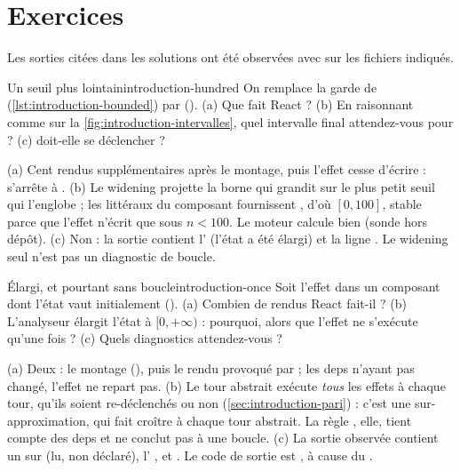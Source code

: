 \section{Exercices}
\label{sec:introduction-exercices}

Les sorties citées dans les solutions ont été observées avec
 sur les fichiers indiqués.

\begin{exercice}{Un seuil plus lointain}{introduction-hundred}
  On remplace la garde de  (\cref{lst:introduction-bounded})
  par  ().
  (a) Que fait React ? (b) En raisonnant comme sur la
  \cref{fig:introduction-intervalles}, quel intervalle final attendez-vous
  pour  ? (c)  doit-elle se déclencher ?
\end{exercice}
\begin{solution}
  (a) Cent rendus supplémentaires après le montage, puis l'effet cesse
  d'écrire :  s'arrête à . (b) Le widening projette la
  borne qui grandit sur le plus petit seuil qui l'englobe ; les littéraux du
  composant fournissent , d'où $[0,100]$, stable parce que l'effet
  n'écrit que sous $n<100$. Le moteur calcule bien 
  (sonde hors dépôt). (c) Non : la sortie contient l'\Info{}
   (l'état a été élargi) et la ligne . Le
  widening seul n'est pas un diagnostic de boucle.
\end{solution}

\begin{exercice}{Élargi, et pourtant sans boucle}{introduction-once}
  Soit l'effet  dans un
  composant  dont l'état vaut initialement 
  (). (a) Combien de rendus React fait-il ?
  (b) L'analyseur élargit l'état  à $[0,+\infty)$ : pourquoi, alors
  que l'effet ne s'exécute qu'une fois ? (c) Quels diagnostics attendez-vous ?
\end{exercice}
\begin{solution}
  (a) Deux : le montage (), puis le rendu provoqué par
   ; les deps \code{[]} n'ayant pas changé, l'effet ne repart
  pas. (b) Le tour abstrait exécute \emph{tous} les effets à chaque tour,
  qu'ils soient re-déclenchés ou non (\cref{sec:introduction-pari}) : c'est
  une sur-approximation, qui fait croître  à chaque tour abstrait. La
  règle , elle, tient compte des deps et ne conclut pas à
  une boucle. (c) La sortie observée contient un \Warning{}
   sur  (lu, non déclaré), l'\Info{}
  , et . Le code de sortie
  est , à cause du \Warning.
\end{solution}

